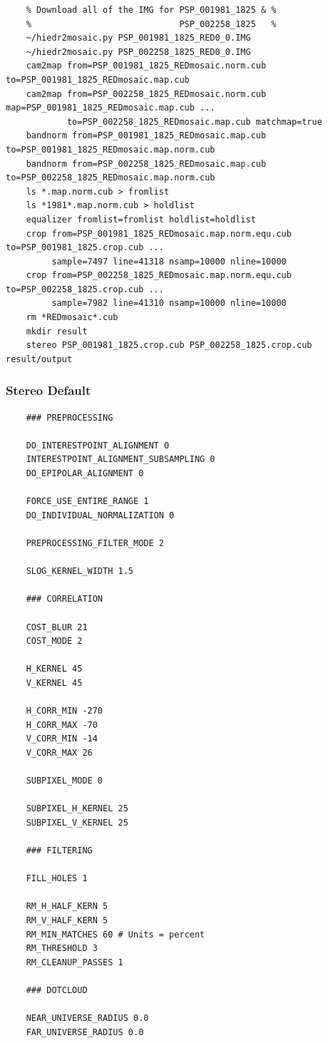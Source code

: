 \begin{verbatim}
    % Download all of the IMG for PSP_001981_1825 & %
    %                             PSP_002258_1825   %
    ~/hiedr2mosaic.py PSP_001981_1825_RED0_0.IMG
    ~/hiedr2mosaic.py PSP_002258_1825_RED0_0.IMG
    cam2map from=PSP_001981_1825_REDmosaic.norm.cub to=PSP_001981_1825_REDmosaic.map.cub
    cam2map from=PSP_002258_1825_REDmosaic.norm.cub map=PSP_001981_1825_REDmosaic.map.cub ...
            to=PSP_002258_1825_REDmosaic.map.cub matchmap=true
    bandnorm from=PSP_001981_1825_REDmosaic.map.cub to=PSP_001981_1825_REDmosaic.map.norm.cub
    bandnorm from=PSP_002258_1825_REDmosaic.map.cub to=PSP_002258_1825_REDmosaic.map.norm.cub
    ls *.map.norm.cub > fromlist
    ls *1981*.map.norm.cub > holdlist
    equalizer fromlist=fromlist holdlist=holdlist
    crop from=PSP_001981_1825_REDmosaic.map.norm.equ.cub to=PSP_001981_1825.crop.cub ...
         sample=7497 line=41318 nsamp=10000 nline=10000
    crop from=PSP_002258_1825_REDmosaic.map.norm.equ.cub to=PSP_002258_1825.crop.cub ...
         sample=7982 line=41310 nsamp=10000 nline=10000
    rm *REDmosaic*.cub
    mkdir result
    stereo PSP_001981_1825.crop.cub PSP_002258_1825.crop.cub result/output
\end{verbatim}

\subsubsection*{Stereo Default}

\begin{verbatim}
    ### PREPROCESSING

    DO_INTERESTPOINT_ALIGNMENT 0
    INTERESTPOINT_ALIGNMENT_SUBSAMPLING 0
    DO_EPIPOLAR_ALIGNMENT 0

    FORCE_USE_ENTIRE_RANGE 1
    DO_INDIVIDUAL_NORMALIZATION 0

    PREPROCESSING_FILTER_MODE 2

    SLOG_KERNEL_WIDTH 1.5

    ### CORRELATION

    COST_BLUR 21
    COST_MODE 2

    H_KERNEL 45
    V_KERNEL 45

    H_CORR_MIN -270
    H_CORR_MAX -70
    V_CORR_MIN -14
    V_CORR_MAX 26

    SUBPIXEL_MODE 0

    SUBPIXEL_H_KERNEL 25
    SUBPIXEL_V_KERNEL 25

    ### FILTERING

    FILL_HOLES 1

    RM_H_HALF_KERN 5
    RM_V_HALF_KERN 5
    RM_MIN_MATCHES 60 # Units = percent
    RM_THRESHOLD 3
    RM_CLEANUP_PASSES 1

    ### DOTCLOUD

    NEAR_UNIVERSE_RADIUS 0.0
    FAR_UNIVERSE_RADIUS 0.0
\end{verbatim}



